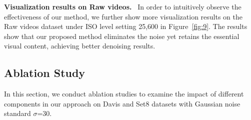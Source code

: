 \documentclass[journal]{IEEEtran}
\newcommand{\blue}[1]{{\color{blue}{#1}}}
\begin{document}
 
\begin{table}[ht]
\renewcommand{\arraystretch}{1.2}

\end{table}


\noindent
\textbf{Visualization results on Raw videos.}~
In order to intuitively observe the effectiveness of our method, we further show more visualization results on the Raw videos dataset under ISO level setting 25,600 in Figure~\ref{fig:9}. The results show that our proposed method eliminates the noise yet retains the essential visual content, achieving better denoising results. 


\subsection{Ablation Study}
In this section, we conduct ablation studies to examine the impact of different components in our approach on Davis and Set8 datasets with Gaussian noise standard $\sigma$=30.
\end{document}
